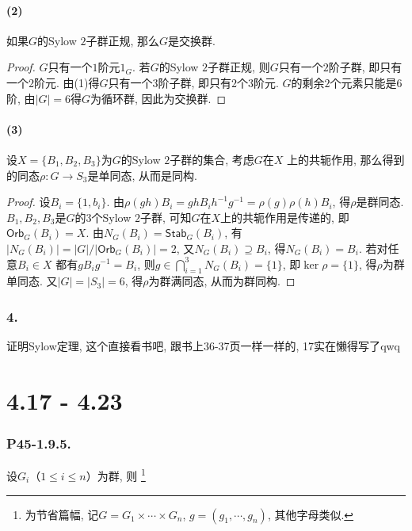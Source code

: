 \documentclass[12pt, a4paper, fontset=windows]{ctexart}
\newcommand{\Orb}{\mathsf{Orb}}
\newcommand{\Stab}{\mathsf{Stab}}
\newcommand{\abs}[1]{\left|{#1}\right|}
\newcommand{\kh}[1]{（{#1}）} %
\newcommand{\timess}{\times\cdots\times}
\begin{document}
\subsection*{(2)}

如果$G$的Sylow $2$子群正规, 那么$G$是交换群. 

\begin{proof}
$G$只有一个$1$阶元$1_G$. 
若$G$的Sylow $2$子群正规, 则$G$只有一个$2$阶子群, 
即只有一个$2$阶元. 由(1)得$G$只有一个$3$阶子群, 
即只有$2$个$3$阶元. $G$的剩余$2$个元素只能是$6$阶, 
由$\abs{G}=6$得$G$为循环群, 因此为交换群. 
\end{proof}

\subsection*{(3)}

设$X=\{B_1,B_2,B_3\}$为$G$的Sylow $2$子群的集合, 考虑$G$在$X$
上的共轭作用, 那么得到的同态$\rho:G\to S_3$是单同态, 从而是同构. 

\begin{proof}
设$B_i=\{1,b_i\}$. 
由$\rho(gh)B_i=ghB_ih^{-1}g^{-1}=\rho(g)\rho(h)B_i$, 得$\rho$是群同态. 
$B_1,B_2,B_3$是$G$的$3$个Sylow $2$子群, 可知$G$在$X$上的共轭作用是传递的, 即$\Orb_{G}(B_i)=X$. 
由$N_G(B_i)=\Stab_{G}(B_i)$, 有$\abs{N_G(B_i)}=\abs{G}/\abs{\Orb_{G}(B_i)}=2$, 
又$N_G(B_i)\supseteq B_i$, 得$N_G(B_i)=B_i$. 若对任意$B_i\in X$
都有$gB_ig^{-1}=B_i$, 则$g\in\bigcap^3_{i=1}N_G(B_i)=\{1\}$, 
即$\ker\rho=\{1\}$, 得$\rho$为群单同态. 又$\abs{G}=\abs{S_3}=6$, 
得$\rho$为群满同态, 从而为群同构. 
\end{proof}

\section*{4.}

证明Sylow定理, 这个直接看书吧, 跟书上36-37页\cite{jsds}一样一样的, 17实在懒得写了{\sf qwq}

\clearpage
\part{4.17 - 4.23}

\section*{P45-1.9.5.}

设$G_i$\kh{$1\le i\le n$}为群, 则
\footnote{为节省篇幅, 记$G=G_1\timess G_n$, $g=(g_1,\cdots,g_n)$, 其他字母类似. }
\end{document}

